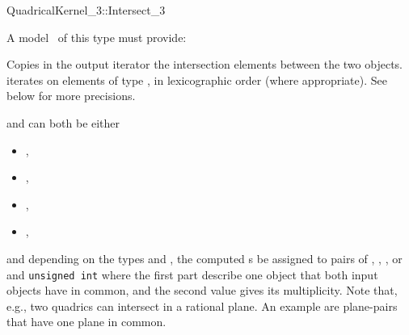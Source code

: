 
\begin{ccRefFunctionObjectConcept}{QuadricalKernel_3::Intersect_3}

\ccRefines



A model \ccVar\ of this type must provide:

{Copies in the output iterator the intersection elements between the
two objects.  iterates on
elements of type , in lexicographic order
(where appropriate). See below for more precisions.}


 and  can both 
be either

\begin{itemize}
\item {} ,
\item {} ,
\item {} ,
\item {} ,
\end{itemize} 

and depending on the types  and , the computed 
s be assigned to pairs of
, , , or 
and {\tt unsigned int} where the first part describe
one object that both input objects have in common, and the second
value gives its multiplicity. Note that, e.g., two quadrics
can intersect in a rational plane. 
An example are plane-pairs that have one plane in common.

\end{ccRefFunctionObjectConcept}

